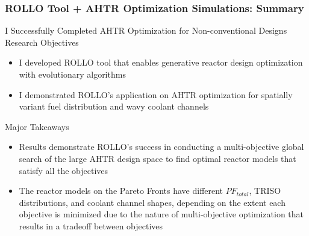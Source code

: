 \begin{frame}
    \frametitle{ROLLO Tool + AHTR Optimization Simulations: Summary}
    \begin{block}{I Successfully Completed AHTR Optimization for Non-conventional Designs
    Research Objectives}
    \begin{itemize}
        \item I developed \acrfull{ROLLO} tool that enables generative reactor design
        optimization with evolutionary algorithms 
        \item I demonstrated ROLLO's application on AHTR optimization for spatially variant 
        fuel distribution and wavy coolant channels
    \end{itemize}    
    \end{block}
    \begin{block}{Major Takeaways}
        \begin{itemize}
            \item Results demonstrate ROLLO's success in conducting a multi-objective 
            global search of the large AHTR design space to find optimal reactor models 
            that satisfy all the objectives
            \item The reactor models on the Pareto Fronts have different $PF_{total}$, 
            TRISO distributions, and coolant channel shapes, depending on the extent 
            each objective is minimized due to the nature of multi-objective
            optimization that results in a tradeoff between objectives
        \end{itemize}
    \end{block}
\end{frame}